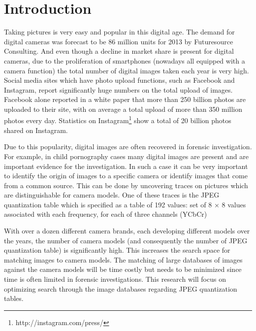 \documentclass[a4paper,8pt]{article}
\begin{document}
\maketitle

\section*{Introduction}
Taking pictures is very easy and popular in this digital age. The demand for digital cameras was forecast to be 86 million units for 2013 by Futuresource Consulting\cite{futuresource}. And even though a decline in market share is present for digital cameras, due to the  proliferation of smartphones (nowadays all equipped with a camera function) the total number of digital images taken each year is very high. Social media sites which have photo upload functions, such as Facebook and Instagram, report significantly huge numbers on the total upload of images. Facebook alone reported in a white paper \cite{whitefacebook} that more than 250 billion photos are uploaded to their site, with on average a total upload of more than 350 million photos every day. Statistics on Instagram\footnote{http://instagram.com/press/} show a total of 20 billion photos shared on Instagram.

Due to this popularity, digital images are often recovered in forensic investigation. For example, in child pornography cases many digital images are present and are important evidence for the investigation. In such a case it can be very important to identify the origin of images to a specific camera or identify images that come from a common source. This can be done by uncovering traces on pictures which are distinguishable for camera models. One of these traces is the JPEG quantization table which is specified as a table of 192 values: set of 8 × 8 values associated with each frequency, for each of three channels (YCbCr)

With over a dozen different camera brands, each developing different models over the years, the number of camera models (and consequently the number of JPEG quantization table) is significantly high. This increases the search space for matching images to camera models. The matching of large databases of images against the camera models will be time costly but needs to be minimized since time is often limited in forensic investigations. This research will focus on optimizing search through the image databases regarding JPEG quantization tables.

\end{document}
